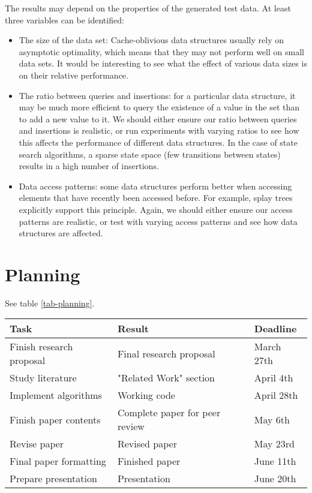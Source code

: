 \documentclass{acm_proc_article-sp}
\begin{document}
The results may depend on the properties of the generated test data. At least three variables can be identified:
\begin{itemize}
\item The size of the data set: Cache-oblivious data structures usually rely on asymptotic optimality, which means that they may not perform well on small data sets. It would be interesting to see what the effect of various data sizes is on their relative performance.
\item The ratio between queries and insertions: for a particular data structure, it may be much more efficient to query the existence of a value in the set than to add a new value to it. We should either ensure our ratio between queries and insertions is realistic, or run experiments with varying ratios to see how this affects the performance of different data structures. In the case of state search algorithms, a sparse state space (few transitions between states) results in a high number of insertions.
\item Data access patterns: some data structures perform better when accessing elements that have recently been accessed before. For example, splay trees explicitly support this principle. Again, we should either ensure our access patterns are realistic, or test with varying access patterns and see how data structures are affected.
\end{itemize}

\section{Planning}
See table \ref{tab-planning}.

\begin{table*}
\begin{center}
\begin{tabular}{ | l | l | l | }
\hline
\textbf{Task} & \textbf{Result} & \textbf{Deadline} \\
\hline
Finish research proposal
    & Final research proposal
    & March 27th \\
Study literature
    & "Related Work" section
    & April 4th \\
Implement algorithms
    & Working code
    & April 28th \\
Finish paper contents
    & Complete paper for peer review
    & May 6th \\
Revise paper
    & Revised paper
    & May 23rd \\
Final paper formatting
    & Finished paper
    & June 11th \\
Prepare presentation
    & Presentation
    & June 20th \\
\hline
\end{tabular}
\caption{Planning}
\label{tab-planning}
\end{center}
\end{table*}



\end{document}
